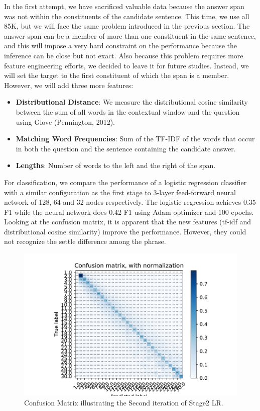 In the first attempt, we have sacrificed valuable data because the answer span was not within the constituents of the candidate sentence. This time, we use all 85K, but we will face the same problem introduced in the previous section. The answer span can be a member of more than one constituent in the same sentence, and this will impose a very hard constraint on the performance because the inference can be close but not exact. Also because this problem requires more feature engineering efforts, we decided to leave it for future studies. Instead, we will set the target to the first constituent of which the span is a member. However, we will add three more features:

\begin{itemize}
\item \textbf{Distributional Distance}: We measure the distributional cosine similarity between the sum of all words in the contextual window and the question using Glove (Pennington, 2012). 

\item \textbf{Matching Word Frequencies}: Sum of the TF-IDF of the words that occur in both the question and the sentence containing the candidate answer.

\item \textbf{Lengths}: Number of words to the left and the right of the span.
\end{itemize}

For classification, we compare the performance of a logistic regression classifier with a similar configuration as the first stage to 3-layer feed-forward neural network of 128, 64 and 32 nodes respectively. The logistic regression achieves 0.35 F1 while the neural network does 0.42 F1 using Adam optimizer and 100 epochs. Looking at the confusion matrix, it is apparent that the new features (tf-idf and distributional cosine similarity) improve the performance. However, they could not recognize the settle difference among the phrase.  \\


\begin{figure}
  \includegraphics[scale=1]{../Figures/fig_1.pdf} 
  \caption{Confusion Matrix illustrating the Second iteration of Stage2 LR. }
\end{figure} 


